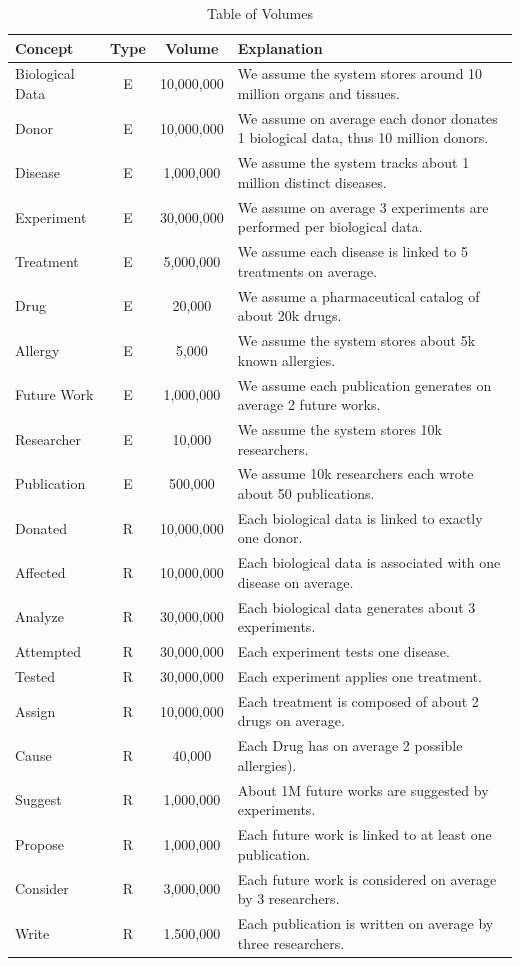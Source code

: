 \documentclass[11pt,a4paper]{article}
\begin{document}
\begin{table}[H]
\centering
\renewcommand{\arraystretch}{1.5} %
\begin{tabular}{|l|c|c|p{7cm}|}
\hline
\textbf{Concept} & \textbf{Type} & \textbf{Volume} & \textbf{Explanation} \\
\hline
Biological Data & E & 10,000,000 & We assume the system stores around 10 million organs and tissues. \\
\hline
Donor & E & 10,000,000 & We assume on average each donor donates 1 biological data, thus 10 million donors. \\
\hline
Disease & E & 1,000,000 & We assume the system tracks about 1 million distinct diseases. \\
\hline
Experiment & E & 30,000,000 & We assume on average 3 experiments are performed per biological data. \\
\hline
Treatment & E & 5,000,000 & We assume each disease is linked to 5 treatments on average. \\
\hline
Drug & E & 20,000 & We assume a pharmaceutical catalog of about 20k drugs. \\
\hline
Allergy & E & 5,000 & We assume the system stores about 5k known allergies. \\
\hline
Future Work & E & 1,000,000 & We assume each publication generates on average 2 future works. \\
\hline
Researcher & E & 10,000 & We assume the system stores 10k researchers. \\
\hline
Publication & E & 500,000 & We assume 10k researchers each wrote about 50 publications. \\
\hline
Donated & R & 10,000,000 & Each biological data is linked to exactly one donor. \\
\hline
Affected & R & 10,000,000 & Each biological data is associated with one disease on average. \\
\hline
Analyze & R & 30,000,000 & Each biological data generates about 3 experiments. \\
\hline
Attempted & R & 30,000,000 & Each experiment tests one disease. \\
\hline
Tested & R & 30,000,000 & Each experiment applies one treatment. \\
\hline
Assign & R & 10,000,000 & Each treatment is composed of about 2 drugs on average. \\
\hline
Cause & R & 40,000 & Each Drug has on average 2 possible allergies). \\
\hline
Suggest & R & 1,000,000 & About 1M future works are suggested by experiments. \\
\hline
Propose & R & 1,000,000 & Each future work is linked to at least one publication. \\
\hline
Consider & R & 3,000,000 & Each future work is considered on average by 3 researchers. \\
\hline
Write & R & 1.500,000 & Each publication is written on average by three researchers. \\
\hline
\end{tabular}
\caption{Table of Volumes}
\end{table}
\end{document}
